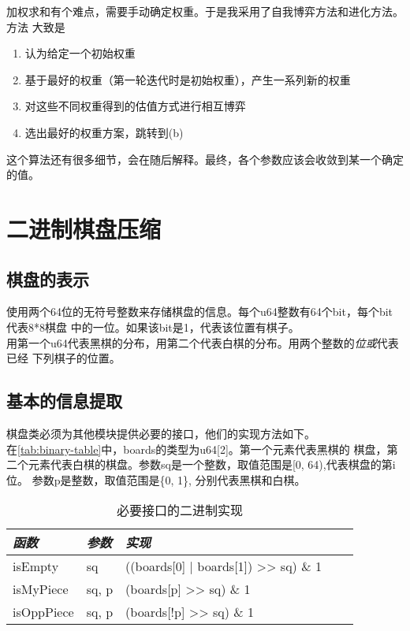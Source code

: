 \documentclass[a4paper]{article}
\begin{document}
加权求和有个难点，需要手动确定权重。于是我采用了自我博弈方法和进化方法。方法
大致是
\begin{enumerate}[label=(\alph*)]
    \item 认为给定一个初始权重
    \item 基于最好的权重（第一轮迭代时是初始权重），产生一系列新的权重
    \item 对这些不同权重得到的估值方式进行相互博弈
    \item 选出最好的权重方案，跳转到(b)
\end{enumerate}
这个算法还有很多细节，会在随后解释。最终，各个参数应该会收敛到某一个确定的值。
\section{二进制棋盘压缩}
\subsection{棋盘的表示}
使用两个64位的无符号整数来存储棋盘的信息。每个u64整数有64个bit，每个bit代表8*8棋盘
中的一位。如果该bit是1，代表该位置有棋子。\\

用第一个u64代表黑棋的分布，用第二个代表白棋的分布。用两个整数的\emph{位或}代表已经
下列棋子的位置。

\subsection{基本的信息提取}
棋盘类必须为其他模块提供必要的接口，他们的实现方法如下。\\

在\autoref{tab:binary-table}中，boards的类型为u64[2]。第一个元素代表黑棋的
棋盘，第二个元素代表白棋的棋盘。参数sq是一个整数，取值范围是[0, 64),代表棋盘的第i位。
参数p是整数，取值范围是\{0, 1\}, 分别代表黑棋和白棋。
\begin{table}[!htb]
\caption{必要接口的二进制实现}\label{tab:binary-table}
\centering
\begin{tabular}{@{} *5l @{}}
    \toprule
\emph{函数} & \emph{参数} & \emph{实现}&& \\
    \midrule
    isEmpty  & sq & ((boards[0] | boards[1]) >> sq) \& 1 \\
    isMyPiece & sq, p & (boards[p] >> sq) \& 1 \\
    isOppPiece & sq, p & (boards[!p] >> sq) \&  1 \\
    \bottomrule
\hline
\end{tabular}
\end{table}
\end{document}
